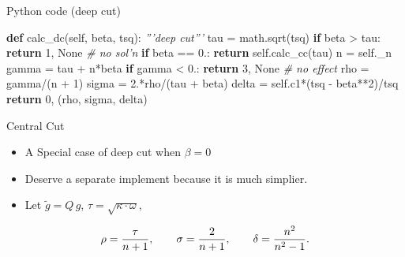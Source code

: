 \documentclass[
  ignorenonframetext,
  aspectratio=169,
  serif,onlymath]{beamer}
\newenvironment{Shaded}{}{}
\newcommand{\CommentTok}[1]{\textcolor[rgb]{0.38,0.63,0.69}{\textit{#1}}}
\newcommand{\ControlFlowTok}[1]{\textcolor[rgb]{0.00,0.44,0.13}{\textbf{#1}}}
\newcommand{\DecValTok}[1]{\textcolor[rgb]{0.25,0.63,0.44}{#1}}
\newcommand{\FloatTok}[1]{\textcolor[rgb]{0.25,0.63,0.44}{#1}}
\newcommand{\KeywordTok}[1]{\textcolor[rgb]{0.00,0.44,0.13}{\textbf{#1}}}
\newcommand{\NormalTok}[1]{#1}
\newcommand{\OperatorTok}[1]{\textcolor[rgb]{0.40,0.40,0.40}{#1}}
\newcommand{\VariableTok}[1]{\textcolor[rgb]{0.10,0.09,0.49}{#1}}
\begin{document}
\begin{frame}[fragile]{Python code (deep cut)}
\protect\hypertarget{python-code-deep-cut}{}

\begin{Shaded}
\begin{Highlighting}[]
\KeywordTok{def}\NormalTok{ calc_dc(}\VariableTok{self}\NormalTok{, beta, tsq):}
    \CommentTok{'''deep cut'''}
\NormalTok{    tau }\OperatorTok{=}\NormalTok{ math.sqrt(tsq)}
    \ControlFlowTok{if}\NormalTok{ beta }\OperatorTok{>}\NormalTok{ tau:}
        \ControlFlowTok{return} \DecValTok{1}\NormalTok{, }\VariableTok{None}    \CommentTok{# no sol'n}
    \ControlFlowTok{if}\NormalTok{ beta }\OperatorTok{==} \FloatTok{0.}\NormalTok{:}
        \ControlFlowTok{return} \VariableTok{self}\NormalTok{.calc_cc(tau)}
\NormalTok{    n }\OperatorTok{=} \VariableTok{self}\NormalTok{._n}
\NormalTok{    gamma }\OperatorTok{=}\NormalTok{ tau }\OperatorTok{+}\NormalTok{ n}\OperatorTok{*}\NormalTok{beta}
    \ControlFlowTok{if}\NormalTok{ gamma }\OperatorTok{<} \FloatTok{0.}\NormalTok{:}
        \ControlFlowTok{return} \DecValTok{3}\NormalTok{, }\VariableTok{None}  \CommentTok{# no effect}
\NormalTok{    rho }\OperatorTok{=}\NormalTok{ gamma}\OperatorTok{/}\NormalTok{(n }\OperatorTok{+} \DecValTok{1}\NormalTok{)}
\NormalTok{    sigma }\OperatorTok{=} \FloatTok{2.}\OperatorTok{*}\NormalTok{rho}\OperatorTok{/}\NormalTok{(tau }\OperatorTok{+}\NormalTok{ beta)}
\NormalTok{    delta }\OperatorTok{=} \VariableTok{self}\NormalTok{.c1}\OperatorTok{*}\NormalTok{(tsq }\OperatorTok{-}\NormalTok{ beta}\OperatorTok{**}\DecValTok{2}\NormalTok{)}\OperatorTok{/}\NormalTok{tsq}
    \ControlFlowTok{return} \DecValTok{0}\NormalTok{, (rho, sigma, delta)}
\end{Highlighting}
\end{Shaded}

\end{frame}

\begin{frame}{Central Cut}
\protect\hypertarget{central-cut}{}

\begin{itemize}
\item
  A Special case of deep cut when \(\beta = 0\)
\item
  Deserve a separate implement because it is much simplier.
\item
  Let \(\tilde{g} = Q\,g\), \(\tau = \sqrt{\kappa\cdot\omega}\),
\end{itemize}

\[\rho = {\tau \over n+1}, \qquad
  \sigma = {2 \over n+1}, \qquad
  \delta = {n^2 \over n^2 - 1}. \]

\end{frame}
\end{document}
